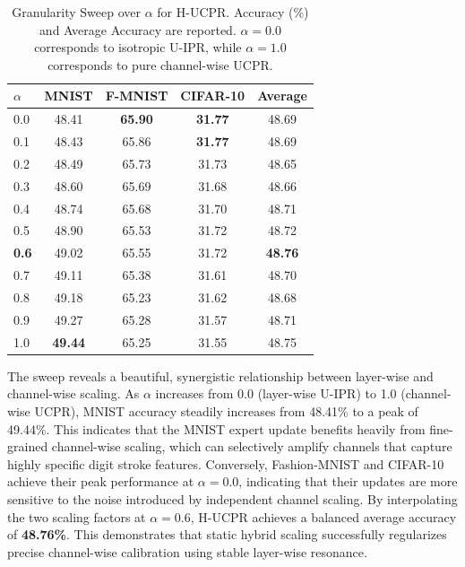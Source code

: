\documentclass{article}
\theoremstyle{plain}
\theoremstyle{definition}
\theoremstyle{remark}
\begin{document}
\begin{table}[t]
\caption{Granularity Sweep over $\alpha$ for H-UCPR. Accuracy (\%) and Average Accuracy are reported. $\alpha=0.0$ corresponds to isotropic U-IPR, while $\alpha=1.0$ corresponds to pure channel-wise UCPR.}
\label{submission3:tab:sweep_alpha}
\vskip 0.15in
\begin{center}
\begin{small}
\begin{sc}
\begin{tabular}{lcccc}
\toprule
$\alpha$ & MNIST & F-MNIST & CIFAR-10 & Average \\
\midrule
0.0 & 48.41 & \textbf{65.90} & \textbf{31.77} & 48.69 \\
0.1 & 48.43 & 65.86 & \textbf{31.77} & 48.69 \\
0.2 & 48.49 & 65.73 & 31.73 & 48.65 \\
0.3 & 48.60 & 65.69 & 31.68 & 48.66 \\
0.4 & 48.74 & 65.68 & 31.70 & 48.71 \\
0.5 & 48.90 & 65.53 & 31.72 & 48.72 \\
\textbf{0.6} & 49.02 & 65.55 & 31.72 & \textbf{48.76} \\
0.7 & 49.11 & 65.38 & 31.61 & 48.70 \\
0.8 & 49.18 & 65.23 & 31.62 & 48.68 \\
0.9 & 49.27 & 65.28 & 31.57 & 48.71 \\
1.0 & \textbf{49.44} & 65.25 & 31.55 & 48.75 \\
\bottomrule
\end{tabular}
\end{sc}
\end{small}
\end{center}
\vskip -0.1in
\end{table}

The sweep reveals a beautiful, synergistic relationship between layer-wise and channel-wise scaling.
As $\alpha$ increases from 0.0 (layer-wise U-IPR) to 1.0 (channel-wise UCPR), MNIST accuracy steadily increases from 48.41\% to a peak of 49.44\%.
This indicates that the MNIST expert update benefits heavily from fine-grained channel-wise scaling, which can selectively amplify channels that capture highly specific digit stroke features.
Conversely, Fashion-MNIST and CIFAR-10 achieve their peak performance at $\alpha = 0.0$, indicating that their updates are more sensitive to the noise introduced by independent channel scaling.
By interpolating the two scaling factors at $\alpha = 0.6$, H-UCPR achieves a balanced average accuracy of \textbf{48.76\%}.
This demonstrates that static hybrid scaling successfully regularizes precise channel-wise calibration using stable layer-wise resonance.
\end{document}
